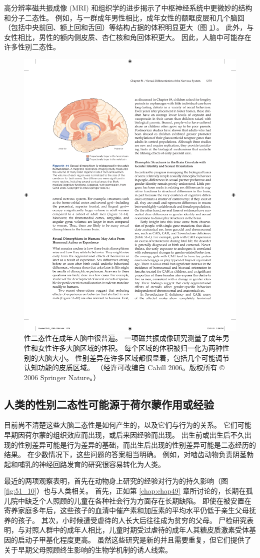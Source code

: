 高分辨率磁共振成像 (MRI) 和组织学的进步揭示了中枢神经系统中更微妙的结构和分子二态性。 例如，与一群成年男性相比，成年女性的额眶皮层和几个脑回（包括中央前回、额上回和舌回）等结构占据的体积明显更大（图 \ref{fig:51_14}）。 此外，与女性相比，男性的额内侧皮质、杏仁核和角回体积更大。 因此，人脑中可能存在许多性别二态性。

\begin{figure}[htbp]
	\centering
	\includegraphics[width=0.5\linewidth]{chap51/fig_51_14}
	\caption{性二态性在成年人脑中很普遍。 一项磁共振成像研究测量了成年男性和女性许多大脑区域的体积。 每个区域的体积被归一化为两种性别的大脑大小。 性别差异在许多区域都很显着，包括几个可能调节认知功能的皮质区域。 （经许可改编自 Cahill 2006。版权所有 © 2006 Springer Nature。）}
	\label{fig:51_14}
\end{figure}


\subsection{人类的性别二态性可能源于荷尔蒙作用或经验}
目前尚不清楚这些大脑二态性是如何产生的，以及它们与行为的关系。 它们可能早期因荷尔蒙的组织效应而出现，或后来因经验而出现。 出生前或出生后不久出现的性别差异可能是行为差异的基础，而出生后出现的性别差异可能是二态经历的结果。 在少数情况下，这些问题的答案相当明确。 例如，对啮齿动物负责阴茎勃起和哺乳的神经回路发育的研究很容易转化为人类。

最近的两项观察表明，首先在动物身上研究的经验对行为的持久影响（图 \ref{fig:51_10}）也与人类相关。 首先，正如第 \ref{chap:chap49} 章所讨论的，长期在孤儿院中缺乏个人照顾的儿童在各种社会行为方面存在长期缺陷。 即使在被安置在寄养家庭多年后，这些孩子的血清中催产素和加压素的平均水平仍低于亲生父母抚养的孩子。 其次，小时候遭受虐待的人长大后往往成为贫穷的父母。 尸检研究表明，与对照人群中的成年人相比，儿童时期受过虐待的成年人其糖皮质激素受体基因的启动子甲基化程度更高。 虽然这些研究是新的并且需要重复，但它们提供了关于早期父母照顾终生影响的生物学机制的诱人线索。

